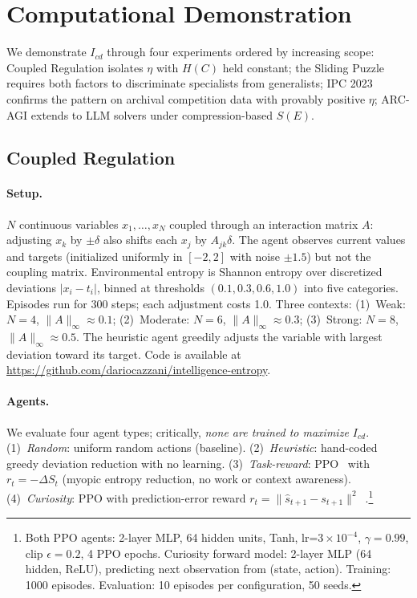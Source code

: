 \documentclass[runningheads,a4paper]{llncs}
\begin{document}
\section{Computational Demonstration}
\label{sec:experiments}

We demonstrate $I_{cd}$ through four experiments ordered by increasing scope: Coupled Regulation isolates $\eta$ with $H(C)$ held constant; the Sliding Puzzle requires both factors to discriminate specialists from generalists; IPC 2023 confirms the pattern on archival competition data with provably positive $\eta$; ARC-AGI extends to LLM solvers under compression-based $S(E)$.

\subsection{Coupled Regulation}
\label{sec:coupled-regulation}

\paragraph{Setup.} $N$ continuous variables $x_1, \ldots, x_N$ coupled through an interaction matrix $A$: adjusting $x_k$ by $\pm\delta$ also shifts each $x_j$ by $A_{jk}\delta$. The agent observes current values and targets (initialized uniformly in $[-2, 2]$ with noise $\pm 1.5$) but not the coupling matrix. Environmental entropy is Shannon entropy over discretized deviations $|x_i - t_i|$, binned at thresholds $(0.1, 0.3, 0.6, 1.0)$ into five categories. Episodes run for 300 steps; each adjustment costs 1.0. Three contexts: (1)~Weak: $N{=}4$, $\|A\|_\infty \approx 0.1$; (2)~Moderate: $N{=}6$, $\|A\|_\infty \approx 0.3$; (3)~Strong: $N{=}8$, $\|A\|_\infty \approx 0.5$. The heuristic agent greedily adjusts the variable with largest deviation toward its target. Code is available at \url{https://github.com/dariocazzani/intelligence-entropy}.

\paragraph{Agents.} We evaluate four agent types; critically, \emph{none are trained to maximize $I_{cd}$}. (1)~\emph{Random}: uniform random actions (baseline). (2)~\emph{Heuristic}: hand-coded greedy deviation reduction with no learning. (3)~\emph{Task-reward}: PPO~\cite{schulman2017proximal} with $r_t = -\Delta S_t$ (myopic entropy reduction, no work or context awareness). (4)~\emph{Curiosity}: PPO with prediction-error reward $r_t = \|\hat{s}_{t+1} - s_{t+1}\|^2$~\cite{pathak2017curiosity}.\footnote{Both PPO agents: 2-layer MLP, 64 hidden units, Tanh, lr=$3{\times}10^{-4}$, $\gamma{=}0.99$, clip $\epsilon{=}0.2$, 4 PPO epochs. Curiosity forward model: 2-layer MLP (64 hidden, ReLU), predicting next observation from (state, action). Training: 1000 episodes. Evaluation: 10 episodes per configuration, 50 seeds.}
\end{document}
